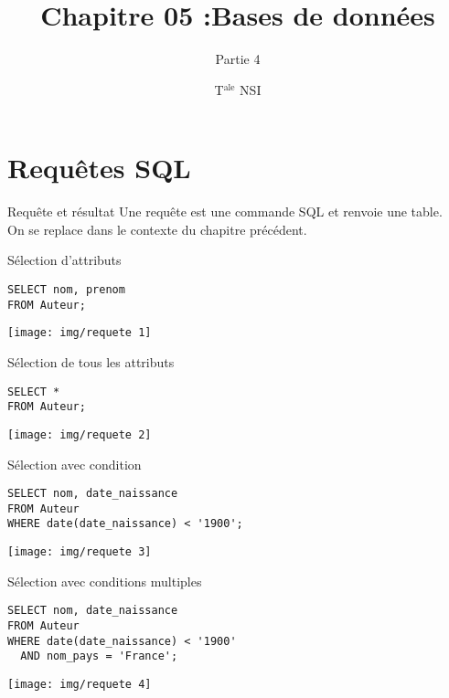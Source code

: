 \documentclass[10pt]{beamer}
\title{Chapitre 05 :Bases de données}
\subtitle{Partie 4}
\author{T$^{\text{ale}}$ NSI}
\begin{document}
	\maketitle
    \section{Requêtes SQL}
\begin{frame}{Requête et résultat}
Une requête est une commande SQL et renvoie une table.\\
On se replace dans le contexte du chapitre précédent.
\end{frame}
\begin{frame}[fragile]{Sélection d'attributs}
	\begin{verbatim}
SELECT nom, prenom
FROM Auteur;
    \end{verbatim}
    \pause
    \begin{center}
    \texttt{[image: img/requete 1]}
    \end{center}
\end{frame}

\begin{frame}[fragile]{Sélection de tous les attributs}
	\begin{verbatim}
SELECT *
FROM Auteur;
    \end{verbatim}
    \pause
    \begin{center}
    \texttt{[image: img/requete 2]}
    \end{center}
\end{frame}

\begin{frame}[fragile]{Sélection avec condition}
	\begin{verbatim}
SELECT nom, date_naissance
FROM Auteur
WHERE date(date_naissance) < '1900';
    \end{verbatim}
    \pause
    \begin{center}
    \texttt{[image: img/requete 3]}
    \end{center}
\end{frame}

\begin{frame}[fragile]{Sélection avec conditions multiples}
	\begin{verbatim}
SELECT nom, date_naissance
FROM Auteur
WHERE date(date_naissance) < '1900'
  AND nom_pays = 'France';
    \end{verbatim}
    \pause
    \begin{center}
    \texttt{[image: img/requete 4]}
    \end{center}
\end{frame}
\end{document}
